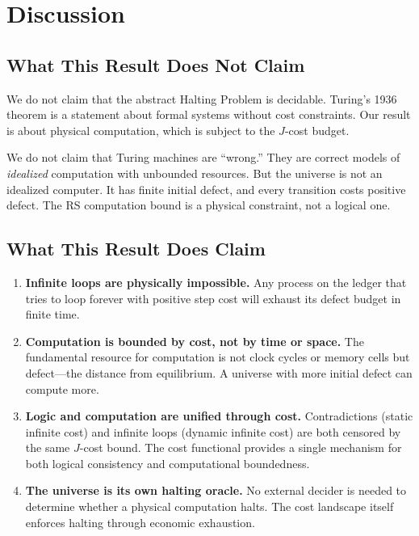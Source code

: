 \documentclass[11pt,a4paper]{article}
\theoremstyle{plain}
\theoremstyle{definition}
\theoremstyle{remark}
\newcommand{\Jcost}{J}
\begin{document}
\section{Discussion}\label{sec:discussion}

\subsection{What This Result Does Not Claim}

We do not claim that the abstract Halting Problem is decidable.
Turing's 1936 theorem is a statement about formal systems without cost constraints.
Our result is about physical computation, which is subject to the $\Jcost$-cost budget.

We do not claim that Turing machines are ``wrong.''
They are correct models of \emph{idealized} computation with unbounded resources.
But the universe is not an idealized computer.
It has finite initial defect, and every transition costs positive defect.
The RS computation bound is a physical constraint, not a logical one.

\subsection{What This Result Does Claim}

\begin{enumerate}[nosep]
\item \textbf{Infinite loops are physically impossible.}
Any process on the ledger that tries to loop forever with positive step cost will exhaust its defect budget in finite time.

\item \textbf{Computation is bounded by cost, not by time or space.}
The fundamental resource for computation is not clock cycles or memory cells but defect---the distance from equilibrium.
A universe with more initial defect can compute more.

\item \textbf{Logic and computation are unified through cost.}
Contradictions (static infinite cost) and infinite loops (dynamic infinite cost) are both censored by the same $\Jcost$-cost bound.
The cost functional provides a single mechanism for both logical consistency and computational boundedness.

\item \textbf{The universe is its own halting oracle.}
No external decider is needed to determine whether a physical computation halts.
The cost landscape itself enforces halting through economic exhaustion.
\end{enumerate}
\end{document}
